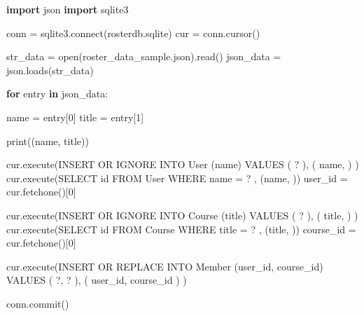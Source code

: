 \documentclass[10pt,]{book}
\newenvironment{Shaded}{}{}
\newcommand{\BuiltInTok}[1]{\textcolor[rgb]{0.00,0.50,0.00}{#1}}
\newcommand{\ControlFlowTok}[1]{\textcolor[rgb]{0.00,0.44,0.13}{\textbf{#1}}}
\newcommand{\DecValTok}[1]{\textcolor[rgb]{0.25,0.63,0.44}{#1}}
\newcommand{\ExtensionTok}[1]{#1}
\newcommand{\ImportTok}[1]{\textcolor[rgb]{0.00,0.50,0.00}{\textbf{#1}}}
\newcommand{\KeywordTok}[1]{\textcolor[rgb]{0.00,0.44,0.13}{\textbf{#1}}}
\newcommand{\NormalTok}[1]{#1}
\newcommand{\OperatorTok}[1]{\textcolor[rgb]{0.40,0.40,0.40}{#1}}
\newcommand{\StringTok}[1]{\textcolor[rgb]{0.25,0.44,0.63}{#1}}
\begin{document}
\begin{Shaded}
\begin{Highlighting}[]
\ImportTok{import}\NormalTok{ json}
\ImportTok{import}\NormalTok{ sqlite3}

\NormalTok{conn }\OperatorTok{=}\NormalTok{ sqlite3.}\ExtensionTok{connect}\NormalTok{(}\StringTok{\textquotesingle{}rosterdb.sqlite\textquotesingle{}}\NormalTok{)}
\NormalTok{cur }\OperatorTok{=}\NormalTok{ conn.cursor()}

\NormalTok{str\_data }\OperatorTok{=} \BuiltInTok{open}\NormalTok{(}\StringTok{\textquotesingle{}roster\_data\_sample.json\textquotesingle{}}\NormalTok{).read()}
\NormalTok{json\_data }\OperatorTok{=}\NormalTok{ json.loads(str\_data)}

\ControlFlowTok{for}\NormalTok{ entry }\KeywordTok{in}\NormalTok{ json\_data:}

\NormalTok{    name }\OperatorTok{=}\NormalTok{ entry[}\DecValTok{0}\NormalTok{]}
\NormalTok{    title }\OperatorTok{=}\NormalTok{ entry[}\DecValTok{1}\NormalTok{]}

    \BuiltInTok{print}\NormalTok{((name, title))}

\NormalTok{    cur.execute(}\StringTok{\textquotesingle{}\textquotesingle{}\textquotesingle{}INSERT OR IGNORE INTO User (name)}
\StringTok{        VALUES ( ? )\textquotesingle{}\textquotesingle{}\textquotesingle{}}\NormalTok{, ( name, ) )}
\NormalTok{    cur.execute(}\StringTok{\textquotesingle{}SELECT id FROM User WHERE name = ? \textquotesingle{}}\NormalTok{, (name, ))}
\NormalTok{    user\_id }\OperatorTok{=}\NormalTok{ cur.fetchone()[}\DecValTok{0}\NormalTok{]}

\NormalTok{    cur.execute(}\StringTok{\textquotesingle{}\textquotesingle{}\textquotesingle{}INSERT OR IGNORE INTO Course (title)}
\StringTok{        VALUES ( ? )\textquotesingle{}\textquotesingle{}\textquotesingle{}}\NormalTok{, ( title, ) )}
\NormalTok{    cur.execute(}\StringTok{\textquotesingle{}SELECT id FROM Course WHERE title = ? \textquotesingle{}}\NormalTok{, (title, ))}
\NormalTok{    course\_id }\OperatorTok{=}\NormalTok{ cur.fetchone()[}\DecValTok{0}\NormalTok{]}

\NormalTok{    cur.execute(}\StringTok{\textquotesingle{}\textquotesingle{}\textquotesingle{}INSERT OR REPLACE INTO Member}
\StringTok{        (user\_id, course\_id) VALUES ( ?, ? )\textquotesingle{}\textquotesingle{}\textquotesingle{}}\NormalTok{,}
\NormalTok{        ( user\_id, course\_id ) )}

\NormalTok{    conn.commit()}
\end{Highlighting}
\end{Shaded}
\end{document}
